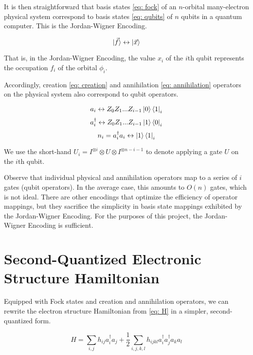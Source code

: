 It is then straightforward that basis states \eqref{eq: fock} of an $n$-orbital many-electron physical system correspond to basis states \eqref{eq: qubits} of $n$ qubits in a quantum computer. This is the Jordan-Wigner Encoding.

\begin{equation}
    \ket{\vec{f}} \leftrightarrow \ket{\vec{x}}
\end{equation}

That is, in the Jordan-Wigner Encoding, the value $x_i$ of the $i$th qubit represents the occupation $f_i$ of the orbital $\phi_i$.

Accordingly, creation \eqref{eq: creation} and annihilation \eqref{eq: annihilation} operators on the physical system also correspond to qubit operators.

\begin{equation}
    a_i \leftrightarrow Z_0Z_1...Z_{i - 1}\ket{0}\bra{1}_i \label{eq: JWdown}
\end{equation}
\begin{equation}
    a^\dag_i \leftrightarrow Z_0Z_1...Z_{i - 1}\ket{1}\bra{0}_i \label{eq: JWup}
\end{equation}
\begin{equation}
    n_i = a^\dag_ia_i \leftrightarrow \ket{1}\bra{1}_i \label{eq: JWnum}
\end{equation}

We use the short-hand $U_i = I^{\otimes i}\otimes U \otimes I^{\otimes n - i - 1}$ to denote applying a gate $U$ on the $i$th qubit.

Observe that individual physical and annihilation operators map to a series of $i$ gates (qubit operators). In the average case, this amounts to $O(n)$ gates, which is not ideal. There are other encodings that optimize the efficiency of operator mappings, but they sacrifice the simplicity in basis state mappings exhibited by the Jordan-Wigner Encoding. For the purposes of this project, the Jordan-Wigner Encoding is sufficient.

\section{Second-Quantized Electronic Structure Hamiltonian}

Equipped with Fock states and creation and annihilation operators, we can rewrite the electron structure Hamiltonian from \eqref{eq: H} in a simpler, second-quantized form.

\begin{equation}
    H = \sum_{i, j} h_{ij}a^\dag_ia_j + \frac{1}{2}\sum_{i,j,k,l} h_{ijkl}a^\dag_ia^\dag_ja_ka_l
\end{equation}


